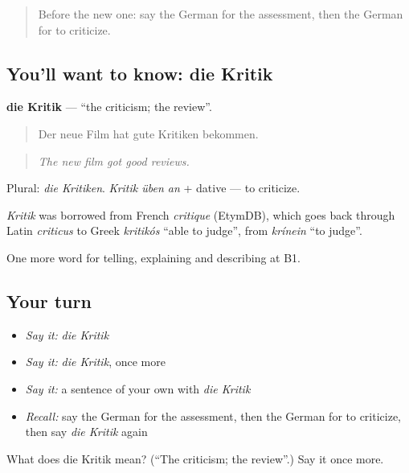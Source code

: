 \label{lesson:GE-C340-kritik}



\begin{quote}
Before the new one: say the German for the assessment, then the German for to criticize.
\end{quote}

\subsection*{You'll want to know: die Kritik}
\textbf{die Kritik} — \textquotedblleft{}the criticism; the review\textquotedblright{}.

\begin{quote}
Der neue Film hat gute Kritiken bekommen.
\end{quote}

\begin{quote}
\emph{The new film got good reviews.}
\end{quote}

Plural: \emph{die Kritiken}. \emph{Kritik üben an} + dative — to criticize.

\begin{cousinweb}
\emph{Kritik} was borrowed from French \emph{critique} (EtymDB), which goes back through Latin \emph{criticus} to Greek \emph{kritikós} \textquotedblleft{}able to judge\textquotedblright{}, from \emph{krínein} \textquotedblleft{}to judge\textquotedblright{}.
\end{cousinweb}

\begin{grammarlens}[title={What you've built}]
One more word for telling, explaining and describing at B1.
\end{grammarlens}

\subsection*{Your turn}
\begin{itemize}
\raggedright
  \item \emph{Say it:} \emph{die Kritik}
  \item \emph{Say it:} \emph{die Kritik}, once more
  \item \emph{Say it:} a sentence of your own with \emph{die Kritik}
  \item \emph{Recall:} say the German for the assessment, then the German for to criticize, then say \emph{die Kritik} again
\end{itemize}

\begin{tcolorbox}[breakable,colback=teal!4,colframe=teal!35!black,title={Before you move on}]
What does die Kritik mean? (\textquotedblleft{}The criticism; the review\textquotedblright{}.) Say it once more.
\end{tcolorbox}
